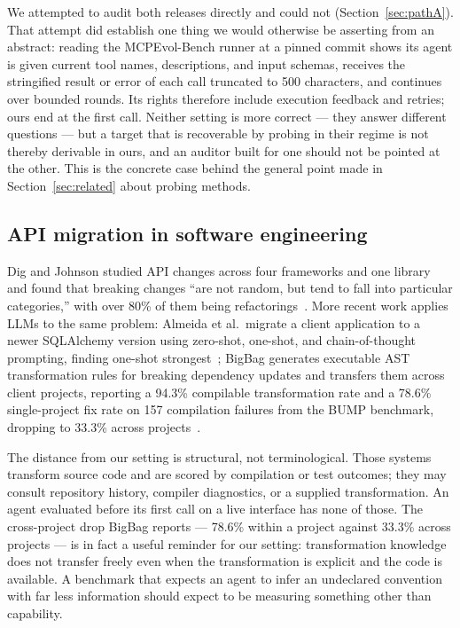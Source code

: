 \documentclass[11pt]{article}
\begin{document}
We attempted to audit both releases directly and could not
(Section~\ref{sec:pathA}). That attempt did establish one thing we would
otherwise be asserting from an abstract: reading the MCPEvol-Bench runner at a
pinned commit shows its agent is given current tool names, descriptions, and
input schemas, receives the stringified result or error of each call truncated
to 500 characters, and continues over bounded rounds. Its rights therefore
include execution feedback and retries; ours end at the first call. Neither
setting is more correct --- they answer different questions --- but a target
that is recoverable by probing in their regime is not thereby derivable in
ours, and an auditor built for one should not be pointed at the other. This is
the concrete case behind the general point made in Section~\ref{sec:related}
about probing methods.

\subsection{API migration in software engineering}

Dig and Johnson studied API changes across four frameworks and one library and
found that breaking changes ``are not random, but tend to fall into particular
categories,'' with over 80\% of them being
refactorings~\cite{dig2006api}. More recent work applies LLMs to the same
problem: Almeida et al.\ migrate a client application to a newer SQLAlchemy
version using zero-shot, one-shot, and chain-of-thought prompting, finding
one-shot strongest~\cite{almeida2024librarymigration}; BigBag generates
executable AST transformation rules for breaking dependency updates and
transfers them across client projects, reporting a 94.3\% compilable
transformation rate and a 78.6\% single-project fix rate on 157 compilation
failures from the BUMP benchmark, dropping to 33.3\% across
projects~\cite{reyes2026bigbag}.

The distance from our setting is structural, not terminological. Those systems
transform source code and are scored by compilation or test outcomes; they may
consult repository history, compiler diagnostics, or a supplied transformation.
An agent evaluated before its first call on a live interface has none of
those. The cross-project drop BigBag reports --- 78.6\% within a project
against 33.3\% across projects --- is in fact a useful reminder for our
setting: transformation knowledge does not transfer freely even when the
transformation is explicit and the code is available. A benchmark that expects
an agent to infer an undeclared convention with far less information should
expect to be measuring something other than capability.
\end{document}
